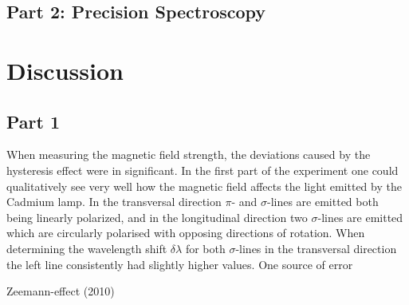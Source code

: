\documentclass[12pt]{article}
\begin{document}
\subsection{Part 2: Precision Spectroscopy}


\section{Discussion}
\subsection{Part 1}
When measuring the magnetic field strength, the deviations caused by the hysteresis effect were in significant. 
In the first part of the experiment one could qualitatively see very well how the magnetic field affects the light emitted by the Cadmium lamp. In the transversal direction $\pi$- and $\sigma$-lines are emitted both being linearly polarized, and in the longitudinal direction two $\sigma$-lines are emitted which are circularly polarised with opposing directions of rotation. When determining the wavelength shift $\delta \lambda$ for both $\sigma$-lines in the transversal direction the left line consistently had slightly higher values. One source of error 



\newpage
\begin{thebibliography}{00}   %

 Zeemann-effect (2010)

\end{thebibliography}
\end{document}

